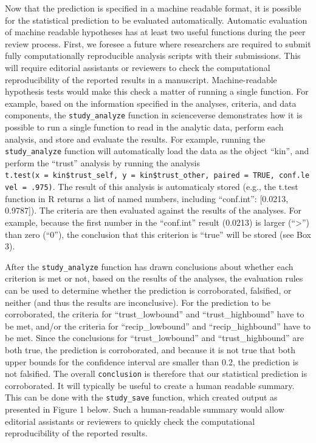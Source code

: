 \documentclass[
  english,
  doc,floatsintext]{apa6}
\begin{document}
Now that the prediction is specified in a machine readable format, it is possible for the statistical prediction to be evaluated automatically. Automatic evaluation of machine readable hypotheses has at least two useful functions during the peer review process. First, we foresee a future where researchers are required to submit fully computationally reproducible analysis scripts with their submissions. This will require editorial assistants or reviewers to check the computational reproducibility of the reported results in a manuscript. Machine-readable hypothesis tests would make this check a matter of running a single function. For example, based on the information specified in the analyses, criteria, and data components, the \texttt{study\_analyze} function in scienceverse demonstrates how it is possible to run a single function to read in the analytic data, perform each analysis, and store and evaluate the results. For example, running the \texttt{study\_analyze} function will automatically load the data as the object \enquote{kin}, and perform the \enquote{trust} analysis by running the analysis \texttt{t.test(x\ =\ kin\$trust\_self,\ y\ =\ kin\$trust\_other,\ paired\ =\ TRUE,\ conf.level\ =\ .975)}. The result of this analysis is automaticaly stored (e.g., the t.test function in R returns a list of named numbers, including \enquote{conf.int}: {[}0.0213, 0.9787{]}). The criteria are then evaluated against the results of the analyses. For example, because the first number in the \enquote{conf.int} result (0.0213) is larger (\enquote{\textgreater{}}) than zero (\enquote{0}), the conclusion that this criterion is \enquote{true} will be stored (see Box 3).

After the \texttt{study\_analyze} function has drawn conclusions about whether each criterion is met or not, based on the results of the analyses, the evaluation rules can be used to determine whether the prediction is corroborated, falsified, or neither (and thus the results are inconclusive). For the prediction to be corroborated, the criteria for \enquote{trust\_lowbound} and \enquote{trust\_highbound} have to be met, and/or the criteria for \enquote{recip\_lowbound} and \enquote{recip\_highbound} have to be met. Since the conclusions for \enquote{trust\_lowbound} and \enquote{trust\_highbound} are both true, the prediction is corroborated, and because it is not true that both upper bounds for the confidence interval are smaller than 0.2, the prediction is not falsified. The overall \texttt{conclusion} is therefore that our statistical prediction is corroborated. It will typically be useful to create a human readable summary. This can be done with the \texttt{study\_save} function, which created output as presented in Figure 1 below. Such a human-readable summary would allow editorial assistants or reviewers to quickly check the computational reproducibility of the reported results.
\end{document}
